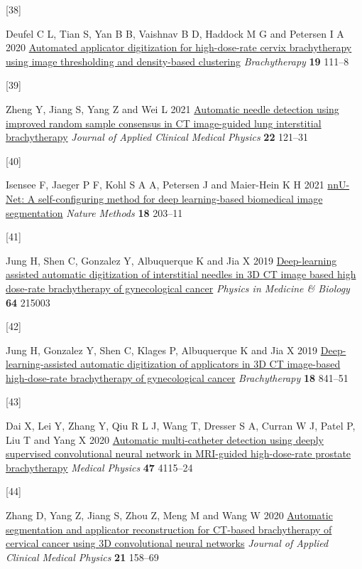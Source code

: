 \documentclass[
  11pt,
]{article}
\newlength{\cslhangindent}
\newlength{\csllabelwidth}
\newenvironment{CSLReferences}[2] %
 {\begin{list}{}{%
  \setlength{\itemindent}{0pt}
  \setlength{\leftmargin}{0pt}
  \setlength{\parsep}{0pt}
  \ifodd #1
   \setlength{\leftmargin}{\cslhangindent}
   \setlength{\itemindent}{-1\cslhangindent}
  \fi
  \setlength{\itemsep}{#2\baselineskip}}}
 {\end{list}}
\newcommand{\CSLLeftMargin}[1]{\parbox[t]{\csllabelwidth}{\strut#1\strut}}
\newcommand{\CSLRightInline}[1]{\parbox[t]{\linewidth - \csllabelwidth}{\strut#1\strut}}
\begin{document}
\begin{CSLReferences}{0}{1}
\CSLLeftMargin{{[}38{]} }%
\CSLRightInline{Deufel C L, Tian S, Yan B B, Vaishnav B D, Haddock M G
and Petersen I A 2020
\href{https://doi.org/10.1016/j.brachy.2019.09.002}{Automated applicator
digitization for high-dose-rate cervix brachytherapy using image
thresholding and density-based clustering} \emph{Brachytherapy}
\textbf{19} 111--8}

\CSLLeftMargin{{[}39{]} }%
\CSLRightInline{Zheng Y, Jiang S, Yang Z and Wei L 2021
\href{https://doi.org/10.1002/acm2.13231}{Automatic needle detection
using improved random sample consensus in {CT} image-guided lung
interstitial brachytherapy} \emph{Journal of Applied Clinical Medical
Physics} \textbf{22} 121--31}

\CSLLeftMargin{{[}40{]} }%
\CSLRightInline{Isensee F, Jaeger P F, Kohl S A A, Petersen J and
Maier-Hein K H 2021
\href{https://doi.org/10.1038/s41592-020-01008-z}{{nnU-Net}: A
self-configuring method for deep learning-based biomedical image
segmentation} \emph{Nature Methods} \textbf{18} 203--11}

\CSLLeftMargin{{[}41{]} }%
\CSLRightInline{Jung H, Shen C, Gonzalez Y, Albuquerque K and Jia X 2019
\href{https://doi.org/10.1088/1361-6560/ab3fcb}{Deep-learning assisted
automatic digitization of interstitial needles in {3D} {CT} image based
high dose-rate brachytherapy of gynecological cancer} \emph{Physics in
Medicine \& Biology} \textbf{64} 215003}

\CSLLeftMargin{{[}42{]} }%
\CSLRightInline{Jung H, Gonzalez Y, Shen C, Klages P, Albuquerque K and
Jia X 2019
\href{https://doi.org/10.1016/j.brachy.2019.06.003}{Deep-learning-assisted
automatic digitization of applicators in 3D CT image-based
high-dose-rate brachytherapy of gynecological cancer}
\emph{Brachytherapy} \textbf{18} 841--51}

\CSLLeftMargin{{[}43{]} }%
\CSLRightInline{Dai X, Lei Y, Zhang Y, Qiu R L J, Wang T, Dresser S A,
Curran W J, Patel P, Liu T and Yang X 2020
\href{https://doi.org/10.1002/mp.14307}{Automatic multi-catheter
detection using deeply supervised convolutional neural network in
{MRI}-guided high-dose-rate prostate brachytherapy} \emph{Medical
Physics} \textbf{47} 4115--24}

\CSLLeftMargin{{[}44{]} }%
\CSLRightInline{Zhang D, Yang Z, Jiang S, Zhou Z, Meng M and Wang W 2020
\href{https://doi.org/10.1002/acm2.13024}{Automatic segmentation and
applicator reconstruction for {CT}-based brachytherapy of cervical
cancer using {3D} convolutional neural networks} \emph{Journal of
Applied Clinical Medical Physics} \textbf{21} 158--69}


\end{CSLReferences}
\end{document}
